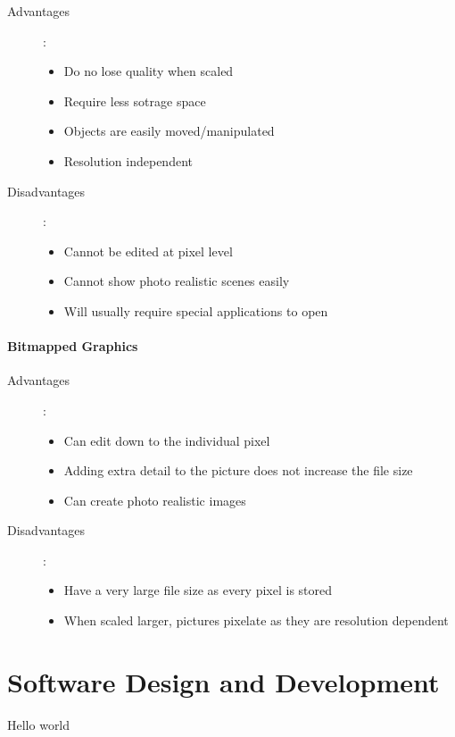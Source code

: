 \documentclass[a4paper, 12pt]{report}
\begin{document}
\begin{description}
\item[Advantages]:
\begin{itemize}
\item Do no lose quality when scaled
\item Require less sotrage space
\item Objects are easily moved/manipulated
\item Resolution independent
\end{itemize}

\item[Disadvantages]:
\begin{itemize}
\item Cannot be edited at pixel level
\item Cannot show photo realistic scenes easily
\item Will usually require special applications to open
\end{itemize}
\end{description}

\subsubsection{Bitmapped Graphics}

\begin{description}
\item[Advantages]:
\begin{itemize}
\item Can edit down to the individual pixel
\item Adding extra detail to the picture does not increase the file size
\item Can create photo realistic images
\end{itemize}

\item[Disadvantages]:
\begin{itemize}
\item Have a very large file size as every pixel is stored
\item When scaled larger, pictures pixelate as they are resolution dependent
\end{itemize}
\end{description}

\chapter{Software Design and Development}
Hello world
\end{document}
